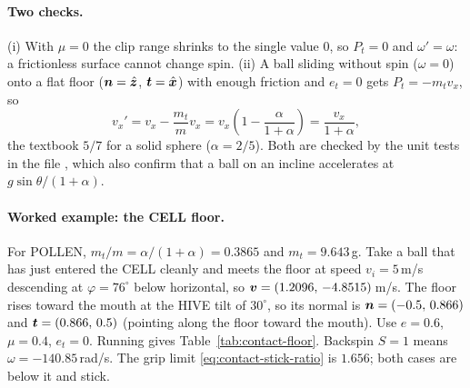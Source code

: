 \paragraph{Two checks.}
(i) With $\mu=0$ the clip range shrinks to the single value $0$, so $P_t=0$ and $\omega'=\omega$: a frictionless
surface cannot change spin. (ii) A ball sliding without spin ($\omega=0$) onto a flat floor
($\bm{n}=\hat{\bm{z}}$, $\bm{t}=\hat{\bm{x}}$) with enough friction and $e_t=0$ gets
$P_t=-m_t v_x$, so
\begin{equation}
  v_x' = v_x - \frac{m_t}{m}v_x = v_x\left(1-\frac{\alpha}{1+\alpha}\right) = \frac{v_x}{1+\alpha},
  \label{eq:contact-rolling-limit}
\end{equation}
the textbook $5/7$ for a solid sphere ($\alpha=2/5$). Both are checked by the unit tests in the file , which also
confirm that a ball on an incline accelerates at $g\sin\theta/(1+\alpha)$.

\paragraph{Worked example: the CELL floor.}
For POLLEN, $m_t/m=\alpha/(1+\alpha)=0.3865$\derived{} and $m_t=9.643$\,\unit{g}\derived. Take a
ball that has just entered the CELL cleanly and meets the floor at speed $v_i=5$\,\unit{m/s}\assumed{}
descending at $\varphi=76^\circ$\assumed{} below horizontal, so
$\bm{v}=(1.2096,\,-4.8515)$\,\unit{m/s}\derived. The floor rises toward the mouth at the HIVE
tilt of $30^\circ$\confirmed, so its normal is $\bm{n}=(-0.5,\,0.866)$\derived{} and
$\bm{t}=(0.866,\,0.5)$\derived{} (pointing along the floor toward the mouth). Use
$e=0.6$\assumed, $\mu=0.4$\assumed, $e_t=0$\assumed. Running  gives
Table~\ref{tab:contact-floor}. Backspin $S=1$\assumed{} means $\omega=-140.85$\,\unit{rad/s}\derived.
The grip limit \eqref{eq:contact-stick-ratio} is $1.656$\derived; both cases are below it and stick.

